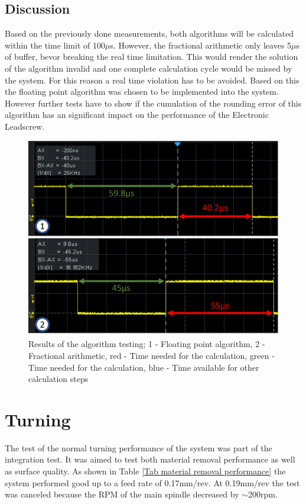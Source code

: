 \subsection{Discussion}
Based on the previously done measurements, both algorithms will be calculated within the time limit of 100$\mu$s. However, the fractional arithmetic only leaves 5$\mu$s of buffer, bevor breaking the real time limitation. This would render the solution of the algorithm invalid and one complete calculation cycle would be missed by the system. For this reason a real time violation has to be avoided.
Based on this the floating point algorithm was chosen to be implemented into the system. However further tests have to show if the cumulation of the rounding error of this algorithm has an significant impact on the performance of the Electronic Leadscrew.

\begin{figure}
    \begin{center}
    \includegraphics[width=12cm]{Pictures/ResArithmetic.png}
    \caption[Results of the algorithm testing]{Results of the algorithm testing; 1 - Floating point algorithm, 2 - Fractional arithmetic, red - Time needed for the calculation, green - Time needed for the calculation, blue - Time available for other calculation steps}
    \label{ResArithmetic}
    \end{center}
\end{figure}


\section{Turning}
The test of the normal turning performance of the system was part of the integration test. It was aimed to test both material removal performance as well as surface quality. As shown in Table \ref{Tab material removal performance} the system performed good up to a feed rate of 0.17mm/rev. At 0.19mm/rev the test was canceled because the RPM of the main spindle decreased by $\sim$200rpm. 

